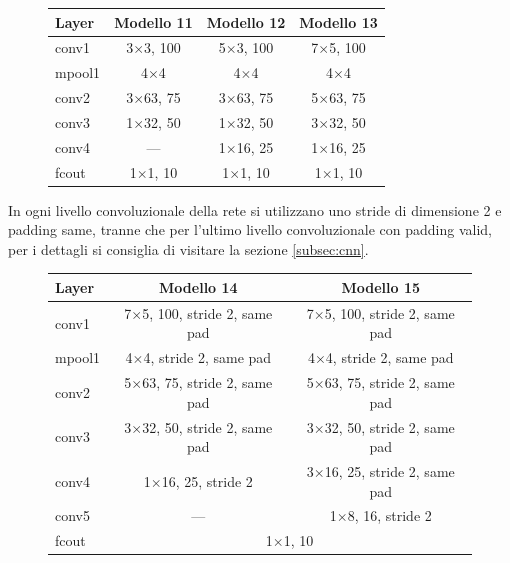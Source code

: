 \begin{figure}[H]
	\centering
	\begin{tabular}{lccc}
		\toprule
		\textbf{Layer} & \textbf{Modello 11} & \textbf{Modello 12} & \textbf{Modello 13}  	\\ 
		\midrule
		conv1 	& {3}$\times${3}, 100	  & {5}$\times${3}, 100 & {7}$\times${5}, 100 	   \\
		mpool1 	& {{4}$\times${4}}	&{{4}$\times${4}}	& {{4}$\times${4}}	 \\
		conv2  	& {3}$\times${63}, 75 &  {3}$\times${63}, 75	  &		{5}$\times${63}, 75    \\
		conv3  	&{1}$\times${32}, 50	  & {1}$\times${32}, 50  &	{3}$\times${32}, 50 	  \\
		conv4  	& ---	  & {1}$\times${16}, 25  &	{1}$\times${16}, 25 	  \\
		fcout	&{{1}$\times${1}, 10} &{{1}$\times${1}, 10}&{{1}$\times${1}, 10}		   \\
		\bottomrule	
	\end{tabular}
	\label{tab:netemb4}
\end{figure}

In ogni livello convoluzionale della rete si utilizzano uno stride di dimensione 2 e padding same, tranne che per l'ultimo livello convoluzionale con padding valid, per i dettagli si consiglia di visitare la sezione { \ref{subsec:cnn}}.

\begin{figure}[H]
	\centering
	\begin{tabular}{lcc}
		\toprule
		\textbf{Layer} & \textbf{Modello 14} & \textbf{Modello 15}   	\\ 
		\midrule
		conv1 	& {{7}$\times${5}, 100, stride 2, same pad}&{{7}$\times${5}, 100, stride 2, same pad} \\
		mpool1 	& {{4}$\times${4}, stride 2, same pad} &{{4}$\times${4}, stride 2, same pad}  \\
		conv2  	& {{5}$\times${63}, 75, stride 2, same pad}&{{5}$\times${63}, 75, stride 2, same pad}    \\
		conv3  	&  {{3}$\times${32}, 50, stride 2, same pad} &{{3}$\times${32}, 50, stride 2, same pad} 	  \\
		conv4  	& {1}$\times${16}, 25, stride 2  &	{3}$\times${16}, 25, stride 2, same pad 	  \\
		conv5  	& ---  &	{1}$\times${8}, 16, stride 2 	  \\
		fcout	& \multicolumn{2}{c}{{1}$\times${1}, 10}		   \\
		\bottomrule	
	\end{tabular}
	\label{tab:rmsebin2}
\end{figure}

